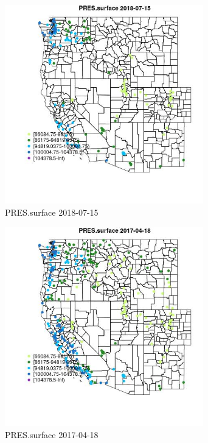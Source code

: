 \begin{figure} 
\centering  
\includegraphics[width=0.77\textwidth]{Code_Outputs/Report_ML_input_PM25_Step4_part_e_de_duplicated_aves_compiled_2019-05-21wNAs_MapObsPRESsurface2018-07-15.jpg} 
\caption{\label{fig:Report_ML_input_PM25_Step4_part_e_de_duplicated_aves_compiled_2019-05-21wNAsMapObsPRESsurface2018-07-15}PRES.surface 2018-07-15} 
\end{figure} 
 

\clearpage 

\begin{figure} 
\centering  
\includegraphics[width=0.77\textwidth]{Code_Outputs/Report_ML_input_PM25_Step4_part_e_de_duplicated_aves_compiled_2019-05-21wNAs_MapObsPRESsurface2017-04-18.jpg} 
\caption{\label{fig:Report_ML_input_PM25_Step4_part_e_de_duplicated_aves_compiled_2019-05-21wNAsMapObsPRESsurface2017-04-18}PRES.surface 2017-04-18} 
\end{figure} 
 

